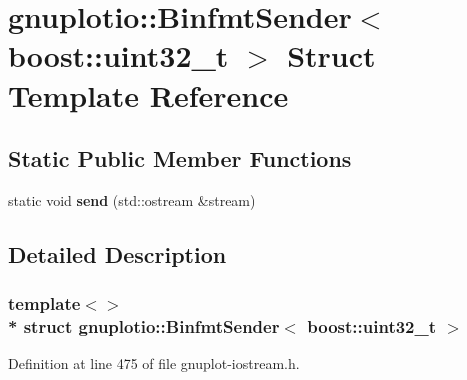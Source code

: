 \hypertarget{structgnuplotio_1_1_binfmt_sender_3_01boost_1_1uint32__t_01_4}{}\section{gnuplotio\+:\+:Binfmt\+Sender$<$ boost\+:\+:uint32\+\_\+t $>$ Struct Template Reference}
\label{structgnuplotio_1_1_binfmt_sender_3_01boost_1_1uint32__t_01_4}
\subsection*{Static Public Member Functions}
\begin{DoxyCompactItemize}
\item 
static void {\bfseries send} (std\+::ostream \&stream)\hypertarget{structgnuplotio_1_1_binfmt_sender_3_01boost_1_1uint32__t_01_4_a134bce57dc5bb3e06c1b369a9826403b}{}\label{structgnuplotio_1_1_binfmt_sender_3_01boost_1_1uint32__t_01_4_a134bce57dc5bb3e06c1b369a9826403b}

\end{DoxyCompactItemize}


\subsection{Detailed Description}
\subsubsection*{template$<$$>$\\*
struct gnuplotio\+::\+Binfmt\+Sender$<$ boost\+::uint32\+\_\+t $>$}



Definition at line 475 of file gnuplot-\/iostream.\+h.

